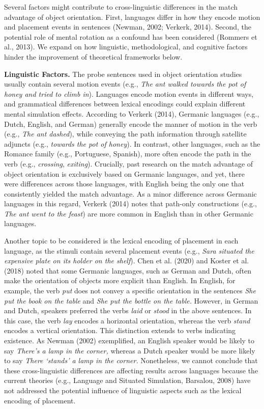 \documentclass[
  man,mask,floatsintext]{apa7}
\begin{document}
Several factors might contribute to cross-linguistic differences in the
match advantage of object orientation. First, languages differ in how
they encode motion and placement events in sentences
(Newman, 2002; Verkerk, 2014). Second, the
potential role of mental rotation as a confound has been considered
(Rommers et al., 2013). We expand on how linguistic,
methodological, and cognitive factors hinder the improvement of
theoretical frameworks below.

\textbf{Linguistic Factors.} The probe sentences used in object orientation
studies usually contain several motion events (e.g., \emph{The ant walked
towards the pot of honey and tried to climb in}). Languages encode
motion events in different ways, and grammatical differences between
lexical encodings could explain different mental simulation effects.
According to Verkerk (2014), Germanic languages (e.g., Dutch, English, and
German) generally encode the manner of motion in the verb (e.g., \emph{The
ant dashed}), while conveying the path information through satellite
adjuncts (e.g., \emph{towards the pot of honey}). In contrast, other
languages, such as the Romance family (e.g., Portuguese, Spanish), more
often encode the path in the verb (e.g., \emph{crossing}, \emph{exiting}).
Crucially, past research on the match advantage of object orientation is
exclusively based on Germanic languages, and yet, there were differences
across those languages, with English being the only one that
consistently yielded the match advantage. As a minor difference across
Germanic languages in this regard, Verkerk (2014) notes that path-only
constructions (e.g., \emph{The ant went to the feast}) are more common in
English than in other Germanic languages.

Another topic to be considered is the lexical encoding of placement in
each language, as the stimuli contain several placement events (e.g.,
\emph{Sara situated the expensive plate on its holder on the shelf}).
Chen et al. (2020) and Koster et al. (2018) noted that
some Germanic languages, such as German and Dutch, often make the
orientation of objects more explicit than English. In English, for
example, the verb \emph{put} does not convey a specific orientation in the
sentences \emph{She put the book on the table} and \emph{She put the bottle on the
table.} However, in German and Dutch, speakers preferred the verbs
\emph{laid} or \emph{stood} in the above sentences. In this case, the verb \emph{lay}
encodes a horizontal orientation, whereas the verb \emph{stand} encodes a
vertical orientation. This distinction extends to verbs indicating
existence. As Newman (2002) exemplified, an
English speaker would be likely to say \emph{There's a lamp in the corner,}
whereas a Dutch speaker would be more likely to say \emph{There `stands' a
lamp in the corner.} Nonetheless, we cannot conclude that these
cross-linguistic differences are affecting results across languages
because the current theories (e.g., Language and Situated Simulation, Barsalou, 2008) have not addressed the potential influence of
linguistic aspects such as the lexical encoding of placement.
\end{document}
